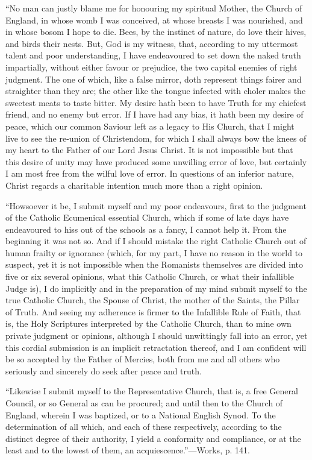 ``No man can justly blame me for honouring my spiritual Mother,
the Church of England, in whose womb I was conceived, at whose breasts
I was nourished, and in whose bosom I hope to die. Bees, by the
instinct of nature, do love their hives, and birds their nests. But,
God is my witness, that, according to my uttermost talent and poor
understanding, I have endeavoured to set down the naked truth
impartially, without either favour or prejudice, the two capital
enemies of right judgment. The one of which, like a false mirror, doth
represent things fairer and straighter than they are; the other like
the tongue infected with choler makes the sweetest meats to taste
bitter. My desire hath been to have Truth for my chiefest
friend, and no enemy but error. If I have had any bias, it hath been
my desire of peace, which our common Saviour left as a legacy to His
Church, that I might live to see the re-union of Christendom, for
which I shall always bow the knees of my heart to the Father of our
Lord Jesus Christ. It is not impossible but that this desire of unity
may have produced some unwilling error of love, but certainly I am
most free from the wilful love of error. In questions of an inferior
nature, Christ regards a charitable intention much more than a right
opinion.


``Howsoever it be, I submit myself and my poor endeavours,
first to the judgment of the Catholic Ecumenical essential Church,
which if some of late days have endeavoured to hiss out of the schools
as a fancy, I cannot help it. From the beginning it was not so. And if
I should mistake the right Catholic Church out of human frailty or
ignorance (which, for my part, I have no reason in the world to
suspect, yet it is not impossible when the Romanists themselves are
divided into five or six several opinions, what this Catholic Church,
or what their infallible Judge is), I do implicitly and in the
preparation of my mind submit myself to the true Catholic Church, the
Spouse of Christ, the mother of the Saints, the Pillar of Truth. And
seeing my adherence is firmer to the Infallible Rule of Faith,
that is, the Holy Scriptures interpreted by the Catholic Church, than
to mine own private judgment or opinions, although I should
unwittingly fall into an error, yet this cordial submission is an
implicit retractation thereof, and I am confident will be so accepted
by the Father of Mercies, both from me and all others who seriously
and sincerely do seek after peace and truth.


``Likewise I submit myself to the Representative Church, that
is, a free General Council, or so General as can be procured; and
until then to the Church of England, wherein I was baptized, or to a
National English Synod. To the determination of all which, and each of
these respectively, according to the distinct degree of their
authority, I yield a conformity and compliance, or at the least and to
the lowest of them, an acquiescence.''—Works, p. 141.


